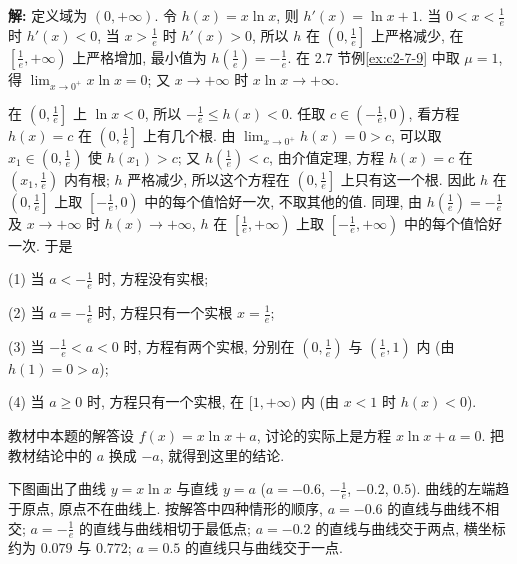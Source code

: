 \documentclass[UTF8,openany]{ctexbook}
\theoremstyle{chinesetextbook}
\newenvironment{cnsolution}{\par\indent\textbf{解:} \ignorespaces}{\par}
\begin{document}
\begin{cnsolution}
定义域为 $(0,+\infty)$. 令 $h(x)=x\ln x$, 则 $h'(x)=\ln x+1$. 当 $\displaystyle0<x<\frac1e$ 时 $h'(x)<0$, 当 $\displaystyle x>\frac1e$ 时 $h'(x)>0$, 所以 $h$ 在 $\displaystyle\left(0,\frac1e\right]$ 上严格减少, 在 $\displaystyle\left[\frac1e,+\infty\right)$ 上严格增加, 最小值为 $\displaystyle h\left(\frac1e\right)=-\frac1e$. 在 2.7 节例\ref{ex:c2-7-9} 中取 $\mu=1$, 得 $\displaystyle\lim_{x\to0^+}x\ln x=0$; 又 $x\to+\infty$ 时 $x\ln x\to+\infty$.

在 $\displaystyle\left(0,\frac1e\right]$ 上 $\ln x<0$, 所以 $\displaystyle-\frac1e\le h(x)<0$. 任取 $\displaystyle c\in\left(-\frac1e,0\right)$, 看方程 $h(x)=c$ 在 $\displaystyle\left(0,\frac1e\right]$ 上有几个根. 由 $\displaystyle\lim_{x\to0^+}h(x)=0>c$, 可以取 $\displaystyle x_1\in\left(0,\frac1e\right)$ 使 $h(x_1)>c$; 又 $\displaystyle h\left(\frac1e\right)<c$, 由介值定理, 方程 $h(x)=c$ 在 $\displaystyle\left(x_1,\frac1e\right)$ 内有根; $h$ 严格减少, 所以这个方程在 $\displaystyle\left(0,\frac1e\right]$ 上只有这一个根. 因此 $h$ 在 $\displaystyle\left(0,\frac1e\right]$ 上取 $\displaystyle\left[-\frac1e,0\right)$ 中的每个值恰好一次, 不取其他的值. 同理, 由 $\displaystyle h\left(\frac1e\right)=-\frac1e$ 及 $x\to+\infty$ 时 $h(x)\to+\infty$, $h$ 在 $\displaystyle\left[\frac1e,+\infty\right)$ 上取 $\displaystyle\left[-\frac1e,+\infty\right)$ 中的每个值恰好一次. 于是

(1) 当 $\displaystyle a<-\frac1e$ 时, 方程没有实根;

(2) 当 $\displaystyle a=-\frac1e$ 时, 方程只有一个实根 $\displaystyle x=\frac1e$;

(3) 当 $\displaystyle-\frac1e<a<0$ 时, 方程有两个实根, 分别在 $\displaystyle\left(0,\frac1e\right)$ 与 $\displaystyle\left(\frac1e,1\right)$ 内 (由 $h(1)=0>a$);

(4) 当 $a\ge0$ 时, 方程只有一个实根, 在 $[1,+\infty)$ 内 (由 $x<1$ 时 $h(x)<0$).

教材中本题的解答设 $f(x)=x\ln x+a$, 讨论的实际上是方程 $x\ln x+a=0$. 把教材结论中的 $a$ 换成 $-a$, 就得到这里的结论.
\end{cnsolution}
下图画出了曲线 $y=x\ln x$ 与直线 $y=a$ ($a=-0.6$, $\displaystyle-\frac1e$, $-0.2$, $0.5$). 曲线的左端趋于原点, 原点不在曲线上. 按解答中四种情形的顺序, $a=-0.6$ 的直线与曲线不相交; $\displaystyle a=-\frac1e$ 的直线与曲线相切于最低点; $a=-0.2$ 的直线与曲线交于两点, 横坐标约为 $0.079$ 与 $0.772$; $a=0.5$ 的直线只与曲线交于一点.
\end{document}
